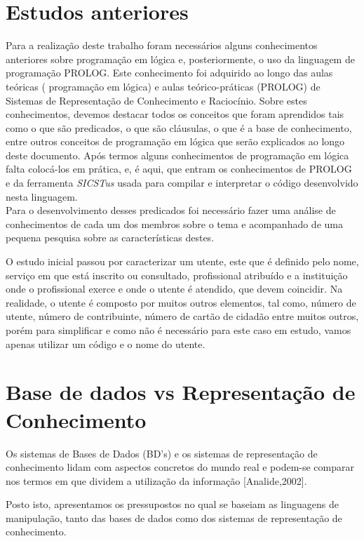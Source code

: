 \section{Estudos anteriores}
\label{p2:estudp}
Para a realização deste trabalho foram necessários alguns conhecimentos anteriores sobre programação em lógica e, posteriormente, o uso da linguagem de programação PROLOG.
Este conhecimento foi adquirido ao longo das aulas teóricas ( programação em lógica) e aulas
teórico-práticas (PROLOG) de Sistemas de Representação de Conhecimento e Raciocínio.
Sobre estes conhecimentos, devemos destacar todos os conceitos que foram aprendidos tais
como o que são predicados, o que são cláusulas, o que é a base de conhecimento, entre outros
conceitos de programação em lógica que serão explicados ao longo deste documento.
Após termos alguns conhecimentos de programação em lógica falta colocá-los em prática,
e, é aqui, que entram os conhecimentos de PROLOG e da ferramenta \textit{SICSTus} usada para
compilar e interpretar o código desenvolvido nesta linguagem.
\\

Para o desenvolvimento desses predicados foi necessário fazer uma análise de conhecimentos de cada um dos membros sobre o tema e acompanhado de uma pequena pesquisa sobre as características destes.

O estudo inicial passou por caracterizar um utente, este que é definido pelo nome, serviço em que está inscrito ou consultado, profissional atribuído e a instituição onde o profissional exerce e onde o utente é atendido, que devem coincidir. Na realidade, o utente é composto por muitos outros elementos, tal como, número de utente, número de contribuinte, número de cartão de cidadão entre muitos outros, porém para simplificar e como não é necessário para este caso em estudo, vamos apenas utilizar um código e o nome do utente. 
\\




\section{Base de dados vs Representação de Conhecimento}
\label{p2:bdrepreconh}

Os sistemas de Bases de Dados (BD’s) e os sistemas de representação de conhecimento lidam
com aspectos concretos do mundo real e podem-se comparar nos termos em que dividem a
utilização da informação [Analide,2002].

Posto isto, apresentamos os pressupostos no qual se baseiam as linguagens de manipulação,
tanto das bases de dados como dos sistemas de representação de conhecimento.

